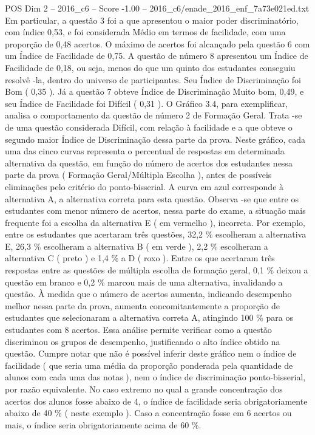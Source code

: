 \begin{textsample}{POS Dim 2 – 2016\_c6 – Score -1.00 – 2016\_c6/enade\_2016\_enf\_7a73e021ed.txt}
Em particular, a questão 3 foi a que apresentou o maior poder discriminatório, com índice 0,53, e foi considerada Médio em termos de facilidade, com uma proporção de 0,48 acertos.
O máximo de acertos foi alcançado pela questão 6 com um Índice de Facilidade de 0,75.
A questão de número 8 apresentou um Índice de Facilidade de 0,18, ou seja, menos do que um quinto dos estudantes conseguiu resolvê -la, dentro do universo de participantes.
Seu Índice de Discriminação foi Bom ( 0,35 ).
Já a questão 7 obteve Índice de Discriminação Muito bom, 0,49, e seu Índice de Facilidade foi Difícil ( 0,31 ).
O Gráfico 3.4, para exemplificar, analisa o comportamento da questão de número 2 de Formação Geral.
Trata -se de uma questão considerada Difícil, com relação à facilidade e a que obteve o segundo maior Índice de Discriminação dessa parte da prova.
Neste gráfico, cada uma das cinco curvas representa o percentual de respostas em determinada alternativa da questão, em função do número de acertos dos estudantes nessa parte da prova ( Formação Geral/Múltipla Escolha ), antes de possíveis eliminações pelo critério do ponto-bisserial.
A curva em azul corresponde à alternativa A, a alternativa correta para esta questão.
Observa -se que entre os estudantes com menor número de acertos, nessa parte do exame, a situação mais frequente foi a escolha da alternativa E ( em vermelho ), incorreta.
Por exemplo, entre os estudantes que acertaram três questões, 32,2 \% escolheram a alternativa E, 26,3 \% escolheram a alternativa B ( em verde ), 2,2 \% escolheram a alternativa C ( preto ) e 1,4 \% a D ( roxo ).
Entre os que acertaram três respostas entre as questões de múltipla escolha de formação geral, 0,1 \% deixou a questão em branco e 0,2 \% marcou mais de uma alternativa, invalidando a questão.
À medida que o número de acertos aumenta, indicando desempenho melhor nessa parte da prova, aumenta concomitantemente a proporção de estudantes que selecionaram a alternativa correta A, atingindo 100 \% para os estudantes com 8 acertos.
Essa análise permite verificar como a questão discriminou os grupos de desempenho, justificando o alto índice obtido na questão.
Cumpre notar que não é possível inferir deste gráfico nem o índice de facilidade ( que seria uma média da proporção ponderada pela quantidade de alunos com cada uma das notas ), nem o índice de discriminação ponto-bisserial, por razão equivalente.
No caso extremo no qual a grande concentração dos acertos dos alunos fosse abaixo de 4, o índice de facilidade seria obrigatoriamente abaixo de 40 \% ( neste exemplo ).
Caso a concentração fosse em 6 acertos ou mais, o índice seria obrigatoriamente acima de 60 \%.

\end{textsample}

